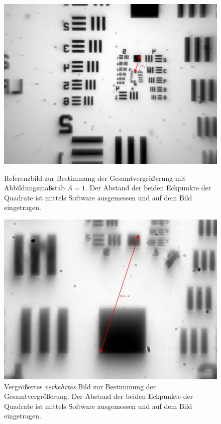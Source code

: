 \documentclass[english, ngerman]{scrartcl}
\begin{document}
\begin{figure}[H]
    \centering
    \begin{minipage}[t]{0.475\linewidth}
        \centering
        \includegraphics[width=\linewidth]{fig/Versuch3/hellfeld_4.1_referenz.jpg}
        \caption[Hellfeld Gesamtvergrößerung Referenz]{Referenzbild zur Bestimmung der Gesamtvergrößerung mit Abbildungsmaßstab $A=1$. Der Abstand der beiden Eckpunkte der Quadrate ist mittels Software ausgemessen und auf dem Bild eingetragen.}
        \label{fig:hellfeld_gesamtvergroeszerung_referenz}
    \end{minipage}%
    \hspace*{\fill}
    \begin{minipage}[t]{0.475\linewidth}
        \centering
        \includegraphics[width=\linewidth]{fig/Versuch3/hellfeld_4.1_vergroeszert.jpg}
        \caption[Hellfeld Gesamtvergrößerung vergrößert]{Vergrößertes \emph{verkehrtes} Bild zur Bestimmung der Gesamtvergrößerung. Der Abstand der beiden Eckpunkte der Quadrate ist mittels Software ausgemessen und auf dem Bild eingetragen.}
        \label{fig:hellfeld_gesamtvergroeszerung_vergroeszert}
    \end{minipage}
\end{figure}
\end{document}
